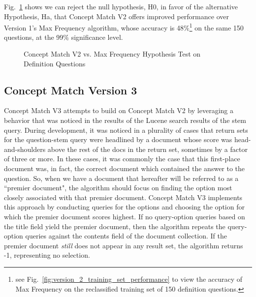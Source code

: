 Fig.~\ref{fig:concept_match_v2_hypothesis_test} shows we can reject the null hypothesis, H0, in favor of the alternative Hypothesis, Ha, that Concept Match V2 offers improved performance over Version 1's Max Frequency algorithm, whose accuracy is 48\%\footnote{see Fig.~\ref{fig:version_2_training_set_performance} to view the accuracy of Max Frequency on the reclassified training set of 150 definition questions.} on the same 150 questions, at the 99\% significance level.

\begin{figure}
\centering
\vspace{1.0in}
\caption{Concept Match V2 vs. Max Frequency Hypothesis Test on Definition Questions}
\label{fig:concept_match_v2_hypothesis_test}
\end{figure}


\subsection{Concept Match Version 3}

Concept Match V3 attempts to build on Concept Match V2 by leveraging a behavior that was noticed in the results of the Lucene search results of the stem query.  
During development, it was noticed in a plurality of cases that  return sets for the question-stem query were headlined by a document whose score was head-and-shoulders above the rest of the docs in the return set, sometimes by a factor of three or more.  In these cases, it was commonly the case that this first-place document was, in fact, the correct document which contained the answer to the question.  So, when we have a document that hereafter will be referred to as a  ``premier document", the algorithm should focus on finding the option most closely associated with that premier document.  Concept Match V3 implements this approach by conducting queries for the options and choosing the option for which the premier document scores highest.  If no query-option queries based on the title field yield the premier document, then the algorithm repeats the query-option queries against the contents field of the document collection.  If the premier document \emph{still} does not appear in any result set, the algorithm returns -1, representing no selection.


